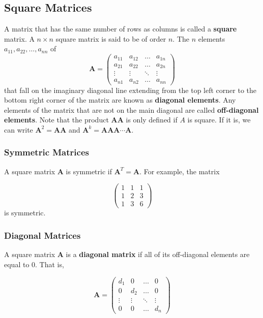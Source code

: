 \documentclass[11pt]{article}
\theoremstyle{definition}
\begin{document}
\subsection{Square Matrices}
A matrix that has the same number of rows as columns is called a \textbf{square} matrix.  A $n \times n$ square matrix is said to be of order $n$.  The $n$ elements $a_{11}, a_{22}, \hdots, a_{nn}$ of
\[\mathbf{A} = 
\begin{pmatrix}
    a_{11} & a_{12} & \dots  & a_{1n} \\
    a_{21} & a_{22}  & \dots  & a_{2n} \\
    \vdots & \vdots  & \ddots & \vdots \\
    a_{n1} & a_{n2}  & \dots  & a_{nn}
\end{pmatrix}
\]
 that fall on the imaginary diagonal line extending from the top left corner to the bottom right corner of the matrix are known as \textbf{diagonal elements}.  Any elements of the matrix that are not on the main diagonal are called \textbf{off-diagonal elements}.  Note that the product $\mathbf{AA}$ is only defined if $A$ is square.  If it is, we can write $\mathbf{A}^2 = \mathbf{AA}$ and $\mathbf{A}^k = \mathbf{AAA\cdots A}$.
 
\subsubsection{Symmetric Matrices}
A square matrix $\mathbf{A}$ is symmetric if $\mathbf{A}^T = \mathbf{A}$.  For example, the matrix

\[\begin{pmatrix}
    1 & 1 & 1\\
    1 & 2 & 3 \\
    1 & 3 & 6   
\end{pmatrix}
\]
is symmetric.

\subsubsection{Diagonal Matrices}
A square matrix $\mathbf{A}$ is a \textbf{diagonal matrix} if all of its off-diagonal elements are equal to 0.  That is,

\[\mathbf{A} = 
\begin{pmatrix}
    d_{1} & 0 & \dots  & 0 \\
    0 & d_{2}  & \dots  & 0 \\
    \vdots & \vdots  & \ddots & \vdots \\
    0 & 0  & \dots  & d_{n}
\end{pmatrix}
\]
\end{document}
